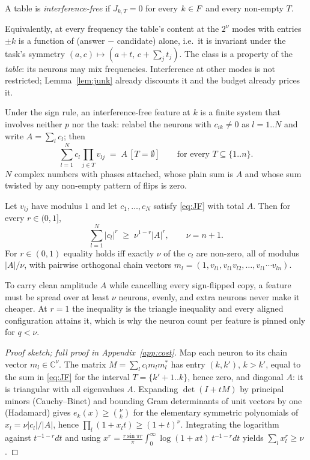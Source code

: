 \begin{definition}
A table is \emph{interference-free} if $J_{k,T}=0$ for every $k\in F$ and every non-empty $T$.
\end{definition}
Equivalently, at every frequency the table's content at the $2^\nu$ modes with entries $\pm k$ is a
function of (answer $-$ candidate) alone, i.e.\ it is invariant under the task's symmetry
$(a,c)\mapsto(a+t,\,c+\sum_jt_j)$. The class is a property of the \emph{table}: its neurons may mix
frequencies. Interference at other modes is not restricted; Lemma~\ref{lem:junk} already discounts it
and the budget already prices it.

Under the sign rule, an interference-free feature at $k$ is a finite system that involves neither $p$
nor the task: relabel the neurons with $c_{ik}\neq 0$ as $l=1..N$ and write $A=\sum_lc_l$; then
\begin{equation}
  \sum_{l=1}^N c_l\prod_{j\in T}v_{lj}\;=\;A\,[T=\emptyset]\qquad\text{for every }T\subseteq\{1..n\}.
  \label{eq:JF}
\end{equation}
$N$ complex numbers with phases attached, whose plain sum is $A$ and whose sum twisted by any non-empty
pattern of flips is zero.

\begin{theorem}
\label{thm:cost}
Let $v_{lj}$ have modulus $1$ and let $c_1,\dots,c_N$ satisfy \eqref{eq:JF} with total $A$. Then for every
$r\in(0,1]$,
\begin{equation}
  \sum_{l=1}^N|c_l|^r\;\ge\;\nu^{1-r}|A|^r,\qquad\nu=n+1 .
\end{equation}
For $r\in(0,1)$ equality holds iff exactly $\nu$ of the $c_l$ are non-zero, all of modulus $|A|/\nu$,
with pairwise orthogonal chain vectors $m_l=(1,v_{l1},v_{l1}v_{l2},\dots,v_{l1}\cdots v_{ln})$.
\end{theorem}
To carry clean amplitude $A$ while cancelling every sign-flipped copy, a feature must be spread over at
least $\nu$ neurons, evenly, and extra neurons never make it cheaper. At $r=1$ the inequality is the
triangle inequality and every aligned configuration attains it, which is why the neuron count per
feature is pinned only for $q<\nu$.

\begin{proof}[Proof sketch; full proof in Appendix~\ref{app:cost}]
Map each neuron to its chain vector $m_l\in\mathbb{C}^\nu$. The matrix $M=\sum_lc_lm_lm_l^*$ has
entry $(k,k')$, $k>k'$, equal to the sum in \eqref{eq:JF} for the interval $T=\{k'+1..k\}$, hence
zero, and diagonal $A$: it is triangular with all eigenvalues $A$. Expanding $\det(I+tM)$ by
principal minors (Cauchy--Binet) and bounding Gram determinants of unit vectors by one (Hadamard) gives
$e_k(x)\ge\binom{\nu}{k}$ for the elementary symmetric polynomials of $x_l=\nu|c_l|/|A|$, hence
$\prod_l(1+x_lt)\ge(1+t)^\nu$. Integrating the logarithm against $t^{-1-r}dt$ and using
$x^r=\frac{r\sin\pi r}{\pi}\int_0^\infty\log(1+xt)\,t^{-1-r}dt$ yields $\sum_lx_l^r\ge\nu$.
\end{proof}


